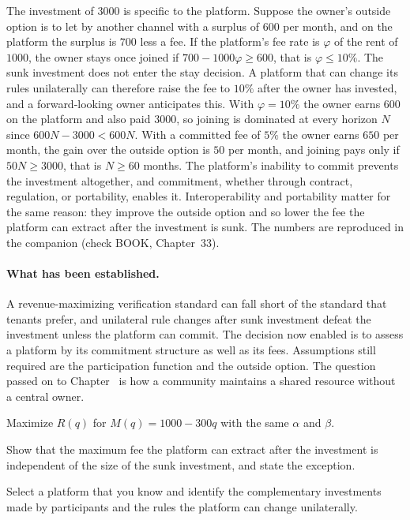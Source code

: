 The investment of $3000$ is specific to the platform. Suppose the owner's outside option is to let by another channel with a surplus of $600$ per month, and on the platform the surplus is $700$ less a fee. If the platform's fee rate is $\varphi$ of the rent of $1000$, the owner stays once joined if $700-1000\varphi\ge 600$, that is $\varphi\le 10\%$. The sunk investment does not enter the stay decision. A platform that can change its rules unilaterally can therefore raise the fee to $10\%$ after the owner has invested, and a forward-looking owner anticipates this. With $\varphi=10\%$ the owner earns $600$ on the platform and also paid $3000$, so joining is dominated at every horizon $N$ since $600N-3000<600N$. With a committed fee of $5\%$ the owner earns $650$ per month, the gain over the outside option is $50$ per month, and joining pays only if $50N\ge 3000$, that is $N\ge 60$ months. The platform's inability to commit prevents the investment altogether, and commitment, whether through contract, regulation, or portability, enables it. Interoperability and portability matter for the same reason: they improve the outside option and so lower the fee the platform can extract after the investment is sunk. The numbers are reproduced in the companion (check BOOK, Chapter~33).

\paragraph{What has been established.} A revenue-maximizing verification standard can fall short of the standard that tenants prefer, and unilateral rule changes after sunk investment defeat the investment unless the platform can commit. The decision now enabled is to assess a platform by its commitment structure as well as its fees. Assumptions still required are the participation function and the outside option. The question passed on to Chapter~ is how a community maintains a shared resource without a central owner.

\begin{exercise}
Maximize $R(q)$ for $M(q)=1000-300q$ with the same $\alpha$ and $\beta$.
\end{exercise}
\begin{exercise}
Show that the maximum fee the platform can extract after the investment is independent of the size of the sunk investment, and state the exception.
\end{exercise}
\begin{exercise}
Select a platform that you know and identify the complementary investments made by participants and the rules the platform can change unilaterally.
\end{exercise}

